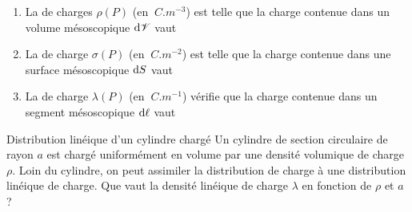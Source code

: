 \documentclass[12pt,fancy]{cours}
\begin{document}
\begin{enumerate}
  \item  La  de charges $\rho(P)$ (en $\SI{}{C.m^{-3}}$) est telle que la charge contenue dans un volume mésoscopique $\mathrm{d} \mathcal{V}$ vaut 
  \item
  La  de charge $\sigma(P)$ (en $\SI{}{C.m^{-2}}$) est telle que la charge contenue dans une surface mésoscopique $\mathrm{d} S$ vaut 
  \item 
  La  de charge $\lambda(P)$ (en $\SI{}{C.m^{-1}}$) vérifie que la charge contenue dans un segment mésoscopique $\mathrm{d} \ell$ vaut 
\end{enumerate}

\begin{exemple}{Distribution linéique d’un cylindre chargé}
  Un cylindre de section circulaire de rayon $a$ est chargé uniformément en volume par une densité volumique de charge $\rho$. Loin du cylindre, on peut assimiler la distribution de charge à une distribution linéique de charge. Que vaut la densité linéique de charge $\lambda$ en fonction de $\rho$ et $a$ ?
\end{exemple}
\end{document}
